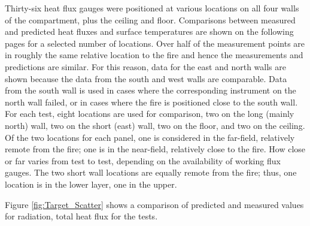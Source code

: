 Thirty-six heat flux gauges were positioned at various locations on all four walls of the compartment,
plus the ceiling and floor.  Comparisons between measured and predicted heat fluxes and surface temperatures are shown on the following pages for a selected number of locations. Over half of the measurement points are in roughly the same relative location to the fire and hence the measurements and predictions are similar.  For this reason, data for the east and north walls are shown because the data from the south and west walls are comparable.  Data from the south wall is used in cases where the corresponding instrument on the north wall failed, or in cases where the fire is positioned close to the south wall. For each test, eight locations are used for comparison, two on the long (mainly north) wall, two on the short (east) wall, two on the floor, and two on the ceiling.  Of the two locations for each panel, one is considered in the far-field, relatively remote from the fire; one is in the near-field, relatively close to the fire.  How close or far varies from test to test, depending on the availability of working flux gauges. The two short wall locations are equally remote from the fire; thus, one location is in the lower layer, one in the upper.

Figure \ref{fig:Target_Scatter} shows a comparison of predicted and measured values for radiation, total heat flux for the tests.

